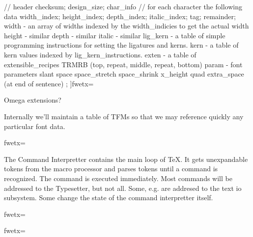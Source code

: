 {{{{   // header
   checksum;
   design_size;
   char_info
       // for each character the following data
       width_index;
       height_index;
       depth_index;
       italic_index;
       tag;
       remainder;
    width  -  an array of widths indexed by the width_indicies to
       get the actual width
    height -  similar
    depth  -  similar
    italic -  similar
    lig_kern - a table of simple programming instructions for
       setting the ligatures and kerns.
    kern - a table of kern values indexed by lig_kern_instructions.
    exten - a table of extensible_recipes TRMRB (top, repeat, middle,
       repeat, bottom)
    param  -  font parameters
       slant
       space
       space_stretch
       space_shrink
       x_height
       quad
       extra_space (at end of sentence)
};
]fwetx=%
\fwcdef 
\fwbeginmacronotes
{}
\fwendmacronotes
\fwendmacro


Omega extensions?

Internally we'll maintain a table of TFMs so that we may
reference quickly any particular font data.



\fwbeginmacro
{}\fwequals \fwodef {}fwetx=%
\fwcdef 
\fwbeginmacronotes
{}
\fwendmacronotes
\fwendmacro



The Command Interpretter contains the main loop of \TeX{}. It gets
unexpandable tokens from the macro processor and parses tokens until
a command is recognized. The command is executed immediately.
Most commands will be addressed to the Typesetter, but not all.
Some, e.g.  are addresed to the text io subsystem.
Some change the state of the command interpretter itself.

\fwbeginmacro
{}\fwequals \fwodef {}fwetx=%
\fwcdef 
\fwbeginmacronotes
{}
\fwendmacronotes
\fwendmacro



\fwbeginmacro
{}\fwequals \fwodef {}fwetx=%
\fwcdef 
\fwbeginmacronotes
{}
\fwendmacronotes
\fwendmacro




}}}

